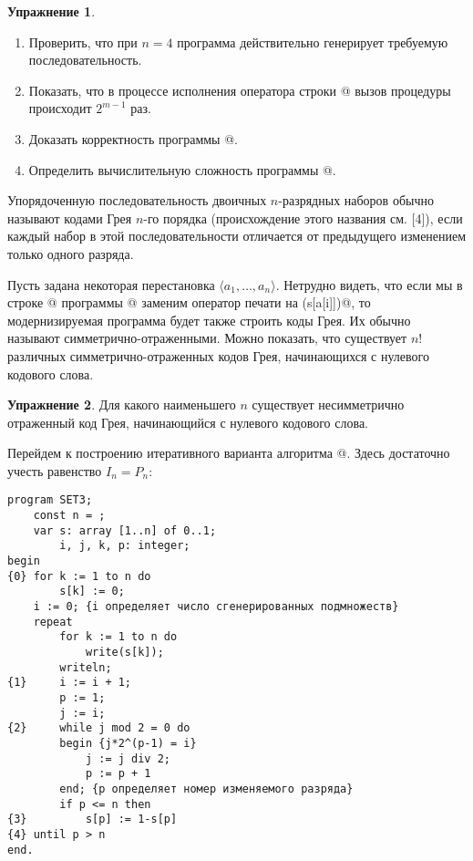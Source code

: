 \documentclass[12pt,a4paper]{article}
\theoremstyle{plain}
\theoremstyle{definition}
\newtheorem*{task}{Упражнение}
\theoremstyle{remark}
\begin{document}
\begin{task}
~\\
\begin{enumerate}
\item Проверить, что при $n=4$ программа действительно генерирует требуемую последовательность.
\item Показать, что в процессе исполнения оператора строки @ вызов процедуры \verb@GRAY@ происходит $2^{m-1}$ раз.
\item Доказать корректность программы @.
\item Определить вычислительную сложность программы @.
\end{enumerate}
\end{task}

Упорядоченную последовательность двоичных $n$-разрядных наборов обычно называют кодами Грея $n$-го порядка (происхождение этого названия см. [4]), если каждый набор в этой последовательности отличается от предыдущего изменением только одного разряда.

Пусть задана некоторая перестановка $\langle a_1,\ldots,a_n\rangle$. Нетрудно видеть, что если мы в строке @ программы @ заменим оператор печати на \verb@write(s[a[i]])@, то модернизируемая программа будет также строить коды Грея. Их обычно называют симметрично-отраженными. Можно показать, что существует $n!$ различных симметрично-отраженных кодов Грея, начинающихся с нулевого кодового слова.

\begin{task}
Для какого наименьшего $n$ существует несимметрично отраженный код Грея, начинающийся с нулевого кодового слова.
\end{task}

Перейдем к построению итеративного варианта алгоритма @. Здесь достаточно учесть равенство $I_n = P_n$:

\begin{verbatim}
program SET3;
    const n = ;
    var s: array [1..n] of 0..1;
        i, j, k, p: integer;
begin
{0} for k := 1 to n do
        s[k] := 0;
    i := 0; {i определяет число сгенерированных подмножеств}
    repeat
        for k := 1 to n do
            write(s[k]);
        writeln;
{1}     i := i + 1;
        p := 1;
        j := i;
{2}     while j mod 2 = 0 do
        begin {j*2^(p-1) = i}
            j := j div 2;
            p := p + 1
        end; {p определяет номер изменяемого разряда}
        if p <= n then
{3}         s[p] := 1-s[p]
{4} until p > n
end.
\end{verbatim}
\end{document}
